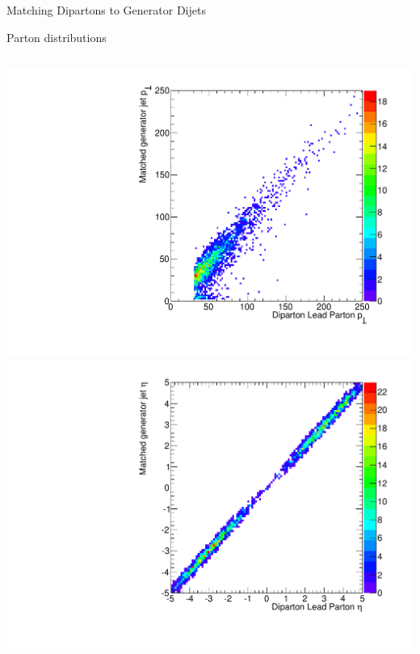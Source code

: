 \documentclass[8pt]{beamer}
\begin{document}
\begin{frame}{Matching Dipartons to Generator Dijets}

\begin{block}{Parton distributions}
  
\begin{columns}
  
  \centering
  \includegraphics[width=0.8\linewidth]{img/SelDiParton_MatchedGenJet_Parton1_Pt.pdf} \\
  \includegraphics[width=0.8\linewidth]{img/SelDiParton_MatchedGenJet_Parton1_Eta.pdf}
  

\end{columns}
\end{block}
\end{frame}
\end{document}
